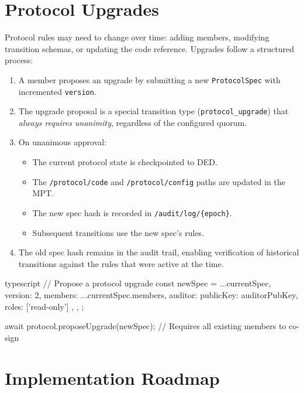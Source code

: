 \documentclass[11pt,a4paper]{article}
\begin{document}
\section{Protocol Upgrades}
\label{sec:upgrades}

Protocol rules may need to change over time: adding members, modifying
transition schemas, or updating the code reference. Upgrades follow a
structured process:

\begin{enumerate}[nosep]
  \item A member proposes an upgrade by submitting a new \texttt{ProtocolSpec}
    with incremented \texttt{version}.
  \item The upgrade proposal is a special transition type
    (\texttt{protocol\_upgrade}) that \emph{always requires unanimity},
    regardless of the configured quorum.
  \item On unanimous approval:
    \begin{itemize}[nosep]
      \item The current protocol state is checkpointed to DED.
      \item The \texttt{/protocol/code} and \texttt{/protocol/config} paths
        are updated in the MPT.
      \item The new spec hash is recorded in \texttt{/audit/log/\{epoch\}}.
      \item Subsequent transitions use the new spec's rules.
    \end{itemize}
  \item The old spec hash remains in the audit trail, enabling verification
    of historical transitions against the rules that were active at the time.
\end{enumerate}

\begin{codebox}{typescript}
// Propose a protocol upgrade
const newSpec = {
  ...currentSpec,
  version: 2,
  members: {
    ...currentSpec.members,
    auditor: { publicKey: auditorPubKey, roles: ['read-only'] },
  },
};

await protocol.proposeUpgrade(newSpec);
// Requires all existing members to co-sign
\end{codebox}


\section{Implementation Roadmap}
\end{document}
